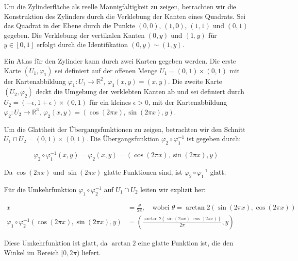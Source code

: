 Um die Zylinderfläche als reelle Mannigfaltigkeit zu zeigen, betrachten wir die Konstruktion des Zylinders durch die Verklebung der Kanten eines Quadrats. Sei das Quadrat in der Ebene durch die Punkte \((0,0)\), \((1,0)\), \((1,1)\) und \((0,1)\) gegeben. Die Verklebung der vertikalen Kanten \((0,y)\) und \((1,y)\) für \(y \in [0,1]\) erfolgt durch die Identifikation \((0,y) \sim (1,y)\).

Ein Atlas für den Zylinder kann durch zwei Karten gegeben werden. Die erste Karte \((U_1, \varphi_1)\) sei definiert auf der offenen Menge \(U_1 = (0,1) \times (0,1)\) mit der Kartenabbildung \(\varphi_1: U_1 \to \mathbb{R}^2\), \(\varphi_1(x,y) = (x,y)\). Die zweite Karte \((U_2, \varphi_2)\) deckt die Umgebung der verklebten Kanten ab und sei definiert durch \(U_2 = (-\epsilon, 1+\epsilon) \times (0,1)\) für ein kleines \(\epsilon > 0\), mit der Kartenabbildung \(\varphi_2: U_2 \to \mathbb{R}^3\), \(\varphi_2(x,y) = (\cos(2\pi x), \sin(2\pi x), y)\).

Um die Glattheit der Übergangsfunktionen zu zeigen, betrachten wir den Schnitt \(U_1 \cap U_2 = (0,1) \times (0,1)\). Die Übergangsfunktion \(\varphi_2 \circ \varphi_1^{-1}\) ist gegeben durch:

\[
\varphi_2 \circ \varphi_1^{-1}(x,y) = \varphi_2(x,y) = (\cos(2\pi x), \sin(2\pi x), y)
\]

Da \(\cos(2\pi x)\) und \(\sin(2\pi x)\) glatte Funktionen sind, ist \(\varphi_2 \circ \varphi_1^{-1}\) glatt.

Für die Umkehrfunktion \(\varphi_1 \circ \varphi_2^{-1}\) auf \(U_1 \cap U_2\) leiten wir explizit her:

\[
\begin{align*}
x &= \frac{\theta}{2\pi}, \quad \text{wobei } \theta = \arctan2(\sin(2\pi x), \cos(2\pi x)) \\
\varphi_1 \circ \varphi_2^{-1}(\cos(2\pi x), \sin(2\pi x), y) &= \left(\frac{\arctan2(\sin(2\pi x), \cos(2\pi x))}{2\pi}, y\right)
\end{align*}
\]

Diese Umkehrfunktion ist glatt, da \(\arctan2\) eine glatte Funktion ist, die den Winkel im Bereich \([0, 2\pi)\) liefert.


